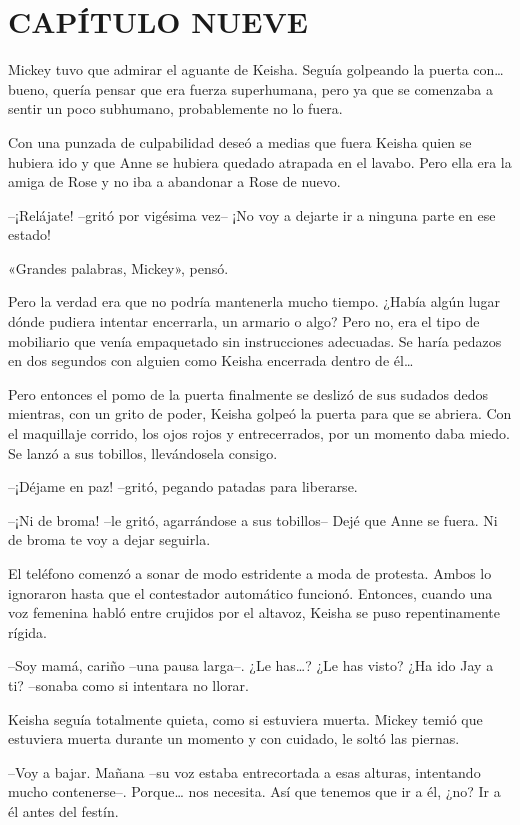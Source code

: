 \chapter*{CAPÍTULO NUEVE}

{Mickey tuvo que admirar el aguante de Keisha. Seguía golpeando la
 puerta con\ldots{} bueno, quería pensar que era fuerza superhumana, pero
 ya que se comenzaba a sentir un poco subhumano, probablemente no lo
fuera.}

{Con una punzada de culpabilidad deseó a medias que fuera Keisha quien
 se hubiera ido y que Anne se hubiera quedado atrapada en el lavabo. Pero
ella era la amiga de Rose y no iba a abandonar a Rose de nuevo.}

{--¡Relájate! --gritó por vigésima vez-- ¡No voy a dejarte ir a ninguna
parte en ese estado!}

{«Grandes palabras, Mickey», pensó.}

{Pero la verdad era que no podría mantenerla mucho tiempo. ¿Había algún
 lugar dónde pudiera intentar encerrarla, un armario o algo? Pero no, era
 el tipo de mobiliario que venía empaquetado sin instrucciones adecuadas.
 Se haría pedazos en dos segundos con alguien como Keisha encerrada
 dentro de él\ldots{}}

{Pero entonces el pomo de la puerta finalmente se deslizó de sus sudados
 dedos mientras, con un grito de poder, Keisha golpeó la puerta para que
 se abriera. Con el maquillaje corrido, los ojos rojos y entrecerrados,
 por un momento daba miedo. Se lanzó a sus tobillos, llevándosela
consigo.}

{--¡Déjame en paz! --gritó, pegando patadas para liberarse.}

{--¡Ni de broma! --le gritó, agarrándose a sus tobillos-- Dejé que Anne
se fuera. Ni de broma te voy a dejar seguirla.}

{El teléfono comenzó a sonar de modo estridente a moda de protesta.
 Ambos lo ignoraron hasta que el contestador automático funcionó.
 Entonces, cuando una voz femenina habló entre crujidos por el altavoz,
Keisha se puso repentinamente rígida.}

{--Soy mamá, cariño --una pausa larga--. ¿Le has\ldots{}? ¿Le has visto?
¿Ha ido Jay a ti? --sonaba como si intentara no llorar.}

{Keisha seguía totalmente quieta, como si estuviera muerta. Mickey temió
 que estuviera muerta durante un momento y con cuidado, le soltó las
piernas.}

{--Voy a bajar. Mañana --su voz estaba entrecortada a esas alturas,
 intentando mucho contenerse--. Porque\ldots{} nos necesita. Así que
tenemos que ir a él, ¿no? Ir a él antes del festín.}

